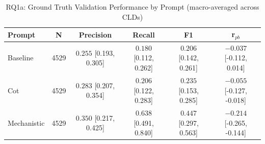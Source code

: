 \begin{table}[htbp]
\centering
\caption{RQ1a: Ground Truth Validation Performance by Prompt (macro-averaged across CLDs)}
\label{tab:rq1a_gt_by_prompt}
\begin{tabular}{lccccc}
\toprule
\textbf{Prompt} & \textbf{N} & \textbf{Precision} & \textbf{Recall} & \textbf{F1} & \textbf{r$_{pb}$} \\
\midrule
Baseline & 4529 & $0.255$ [0.193, 0.305] & $0.180$ [0.112, 0.262] & $0.206$ [0.142, 0.261] & $-0.037$ [-0.112, 0.014] \\
Cot & 4529 & $0.283$ [0.207, 0.354] & $0.206$ [0.122, 0.283] & $0.235$ [0.153, 0.285] & $-0.055$ [-0.127, -0.018] \\
Mechanistic & 4529 & $0.350$ [0.217, 0.425] & $0.638$ [0.491, 0.840] & $0.447$ [0.297, 0.563] & $-0.214$ [-0.265, -0.144] \\
\bottomrule
\end{tabular}
\end{table}
